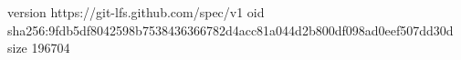 version https://git-lfs.github.com/spec/v1
oid sha256:9fdb5df8042598b7538436366782d4acc81a044d2b800df098ad0eef507dd30d
size 196704
